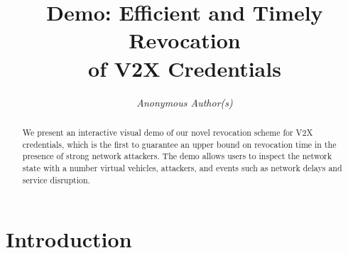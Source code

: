 \documentclass[conference]{IEEEtran}
\begin{document}
%
\title{Demo: Efficient and Timely Revocation\\of V2X Credentials}


\ifdefined\ANON
\author{\em Anonymous Author(s)}
\else
\makeatletter
\newcommand{\linebreakand}{%
  \end{@IEEEauthorhalign}
  \hfill\mbox{}\par
  \mbox{}\hfill\begin{@IEEEauthorhalign}
}
\makeatother

\author{
}
\fi

\IEEEoverridecommandlockouts
\makeatletter{}\makeatother
{}


\maketitle

\begin{abstract}
We present an interactive visual demo of our novel revocation scheme for V2X
credentials, which is the first to guarantee an upper bound on revocation time
in the presence of strong network attackers. The demo allows users to inspect
the network state with a number virtual vehicles, attackers, and events such as
network delays and service disruption.
\end{abstract}

\section{Introduction}
\end{document}
